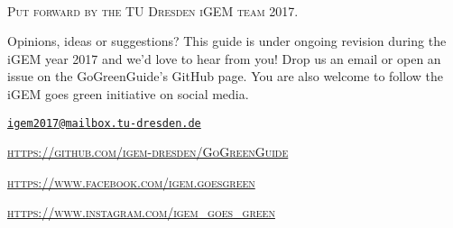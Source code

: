 \documentclass[11pt,fleqn,openany]{book} %
\begin{document}
	\begin{flushright}
			\\\bigskip
		
		\noindent \textsc{Put forward by the TU Dresden iGEM team 2017.}\\\bigskip
		
		\noindent Opinions, ideas or suggestions? This guide is under ongoing revision during the iGEM year 2017 and we'd love to hear from you! Drop us an email or open an issue on the GoGreenGuide's GitHub page. You are also welcome to follow the iGEM goes green initiative on social media.\\\bigskip
		
		\noindent \texttt{\href{mailto:igem2017@mailbox.tu-dresden.de}{igem2017@mailbox.tu-dresden.de}}
		
		\noindent \textsc{\url{https://github.com/igem-dresden/GoGreenGuide}}
		
		\noindent \textsc{\url{https://www.facebook.com/igem.goesgreen}}
		
		\noindent \textsc{\url{https://www.instagram.com/igem_goes_green}}
	\end{flushright}\vspace{-\bigskipamount}
	\pagestyle{empty} %
	\tableofcontents %
	\pagestyle{fancy} %
	
	
	
	
	
	
	
	
	
	
\end{document}
